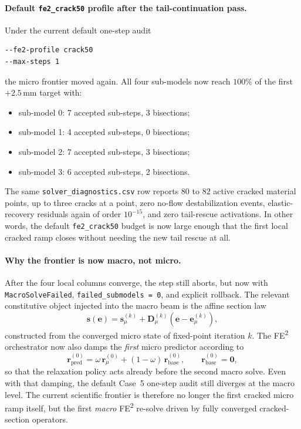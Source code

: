 \paragraph{Default \texttt{fe2\_crack50} profile after the tail-continuation pass.}
Under the current default one-step audit
\begin{verbatim}
--fe2-profile crack50
--max-steps 1
\end{verbatim}
the micro frontier moved again.  All four sub-models now reach
\(100\%\) of the first \(+2.5\)\,mm target with:
\begin{itemize}
  \item sub-model 0: 7 accepted sub-steps, 3 bisections;
  \item sub-model 1: 4 accepted sub-steps, 0 bisections;
  \item sub-model 2: 7 accepted sub-steps, 3 bisections;
  \item sub-model 3: 6 accepted sub-steps, 2 bisections.
\end{itemize}
The same \texttt{solver\_diagnostics.csv} row reports \(80\) to \(82\) active
cracked material points, up to three cracks at a point, zero no-flow
destabilization events, elastic-recovery residuals again of order
\(10^{-15}\), and zero tail-rescue activations.  In other words, the default
\texttt{fe2\_crack50} budget is now large enough that the first local cracked
ramp closes without needing the new tail rescue at all.

\paragraph{Why the frontier is now macro, not micro.}
After the four local columns converge, the step still aborts, but now with
\texttt{MacroSolveFailed}, \texttt{failed\_submodels = 0}, and explicit rollback.
The relevant constitutive object injected into the macro beam is the affine
section law
\begin{equation}
  \mathbf{s}(\mathbf{e})
  = \mathbf{s}^{(k)}_{\mu}
    + \mathbf{D}^{(k)}_{\mu}
      \left(\mathbf{e} - \mathbf{e}^{(k)}_{\mu}\right),
  \label{eq:fe2-affine-section-law}
\end{equation}
constructed from the converged micro state of fixed-point iteration \(k\).
The FE\textsuperscript{2} orchestrator now also damps the \emph{first} micro
predictor according to
\begin{equation}
  \mathbf{r}^{(0)}_{\text{pred}}
  = \omega\,\mathbf{r}^{(0)}_{\mu}
    + (1-\omega)\,\mathbf{r}^{(0)}_{\text{base}},
  \qquad
  \mathbf{r}^{(0)}_{\text{base}} = \mathbf{0},
  \label{eq:first-predictor-damping}
\end{equation}
so that the relaxation policy acts already before the second macro solve.
Even with that damping, the default Case~5 one-step audit still diverges at
the macro level.  The current scientific frontier is therefore no longer the
first cracked micro ramp itself, but the first \emph{macro} FE\textsuperscript{2}
re-solve driven by fully converged cracked-section operators.

